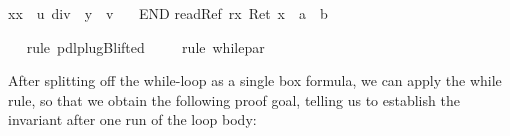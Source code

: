 \begin{isabellebody}
\begin{isamarkuptxt}
\begin{isabelle}
x{\isasymleftarrow}x\ {\isacharcolon}{\isacharequal}\ u\ div\ {}{\isacharsemicolon}\ y\ {\isacharcolon}{\isacharequal}\ v\ {\isacharasterisk}\ {}{\isacharbraceright}\ \isanewline
{}END{\isacharsemicolon}\isanewline
{}readRef\ r{\isacharbraceright}{\isacharbrackright}{\isacharparenleft}{\isasymlambda}x{\isachardot}\ Ret\ {\isacharparenleft}x\ {\isacharequal}\ a\ {\isacharasterisk}\ b{\isacharparenright}{\isacharparenright}%
\end{isabelle}%
\end{isamarkuptxt}%
\ \ \isamarkuptrue%
rule\ pdl{\isacharunderscore}plugB{\isacharunderscore}lifted{}{\isacharparenright}\isanewline
\ \ \ \ \isamarkupfalse%
rule\ while{\isacharunderscore}par{\isacharparenright}\ \ %
\isamarkupfalse%
%
\begin{isamarkuptxt}%
After splitting off the while-loop as a single box formula, we can apply the while
      rule, so that we obtain the following proof goal, telling us to establish the invariant after
      one run of the loop body:


\end{isamarkuptxt}
\end{isabellebody}
